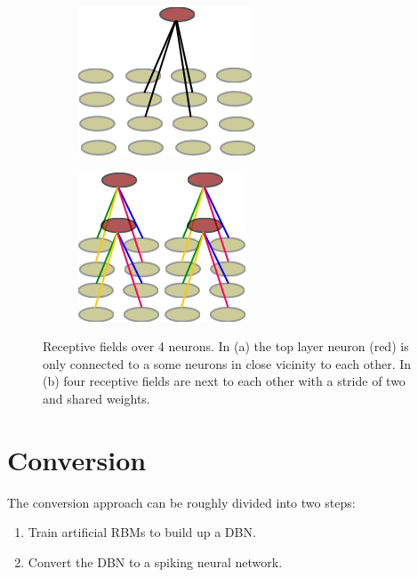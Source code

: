 \begin{figure}[h!]
	\centering
	\begin{subfigure}[t]{.4\textwidth}
  		\centering
  		\includegraphics[width=.5\linewidth]{imgs/recpt_field1.png}
  		\caption{}
  		\label{fig:receptfields1}
	\end{subfigure}%
	\begin{subfigure}[t]{.4\textwidth}
  		\centering
  		\includegraphics[width=.5\linewidth]{imgs/recpt_field2.png}
  		\caption{}
  		\label{fig:receptfields2}
	\end{subfigure}
	\caption[Receptive fields over 4 neurons.]{Receptive fields over 4 neurons. In (a) the top layer neuron (red) is only connected to a some neurons in close vicinity to each other. In (b) four receptive fields are next to each other with a stride of two and shared weights. }
	\label{fig:receptfields}
\end{figure}




\section{Conversion} \label{c:convappro}

The conversion approach can be roughly divided into two steps:
\begin{enumerate}
\item Train artificial RBMs to build up a DBN.
\item Convert the DBN to a spiking neural network.
\end{enumerate}


